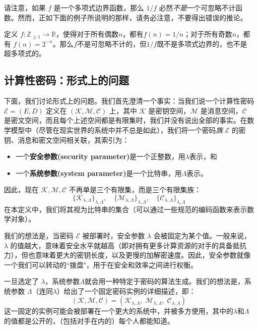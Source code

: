 请注意，如果 $f$ 是一个多项式边界函数，那么 ${1}/{f}$ 必然\emph{不是}一个可忽略不计函数。然而，正如下面的例子所说明的那样，请务必注意，不要得出错误的推论。

\begin{example}
定义 $f:\mathbb{Z}_{\geq1}\to\mathbb{R}$，使得对于所有偶数$n$，都有$f(n)={1}/{n}$；对于所有奇数$n$，都有 $f(n)=2^{-n}$。那么$f$不是可忽略不计的，但${1}/{f}$既不是多项式边界的，也不是超多项式的。
\end{example}

\subsection{计算性密码：形式上的问题}

下面，我们讨论形式上的问题。我们首先澄清一个事实：当我们说一个计算性密码 $\mathcal{E}=(E,D)$ 定义在 $(\mathcal{K},\mathcal{M},\mathcal{C})$ 上，其中 $\mathcal{K}$ 是密钥空间，$\mathcal{M}$ 是消息空间，$\mathcal{C}$ 是密文空间，而且每个上述空间都是有限集时，我们并没有说出全部的事实。在数学模型中（尽管在现实世界的系统中并不总是如此），我们将一个密码\emph{族} $\mathcal{E}$ 的密钥、消息和密文空间相关联，其索引为：
\begin{itemize}
	\item 一个\textbf{安全参数(security parameter)}是一个正整数，用$\lambda$表示，和
	\item 一个\textbf{系统参数(system parameter)}是一个比特串，用$\Lambda$表示。
\end{itemize}
因此，现在 $\mathcal{K},\mathcal{M},\mathcal{C}$ 不再单是三个有限集，而是三个有限集族：
\[
\{\mathcal{K}_{\lambda,\Lambda}\}_{\lambda,\Lambda},\quad
\{\mathcal{M}_{\lambda,\Lambda}\}_{\lambda,\Lambda},\quad
\{\mathcal{C}_{\lambda,\Lambda}\}_{\lambda,\Lambda}
\]
在本定义中，我们将其视为比特串的集合（可以通过一些规范的编码函数来表示数学对象）。

我们的想法是，当密码 $\mathcal{E}$ 被部署时，安全参数 $\lambda$ 会被固定为某个值。一般来说，$\lambda$ 的值越大，意味着安全水平就越高（即对拥有更多计算资源的对手的具备抵抗力），但也意味着更大的密钥长度，以及更慢的加解密速度。因此，安全参数就像一个我们可以转动的``拨盘"，用于在安全和效率之间进行权衡。

一旦选定了 $\lambda$，系统参数$\Lambda$就会用一种特定于密码的算法生成。我们的想法是，系统参数 $\Lambda$（连同$\lambda$）给出了一个固定密码实例的详细描述，即：
\[
(\mathcal{K},\mathcal{M},\mathcal{C})=(\mathcal{K}_{\lambda,\Lambda},\;\mathcal{M}_{\lambda,\Lambda},\;\mathcal{C}_{\lambda,\Lambda})
\]
这一固定的实例可能会被部署在一个更大的系统中，并被多方使用，其中的$\lambda$和$\Lambda$的值都是公开的，（包括对手在内的）每个人都能知道。

